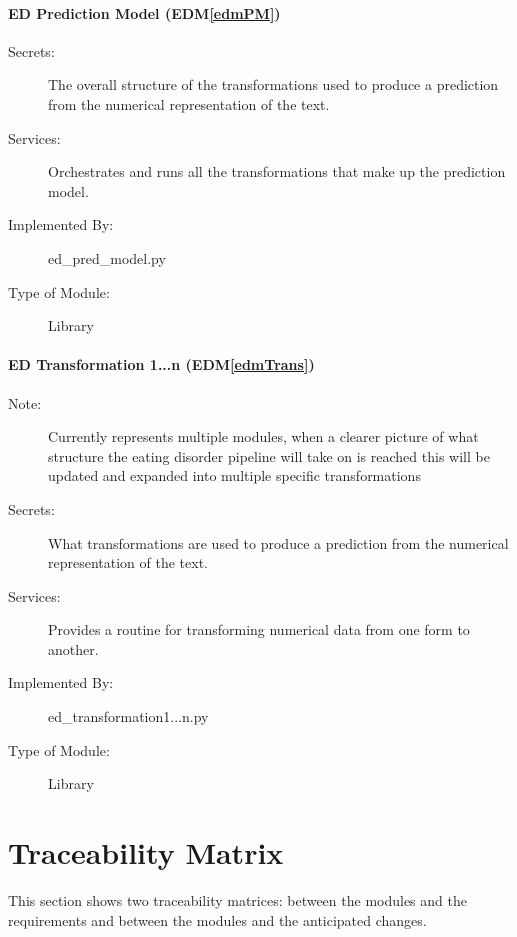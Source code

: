\documentclass[12pt, titlepage]{article}
\newcommand{\edmref}[1]{EDM\ref{#1}}
\begin{document}
\paragraph{ED Prediction Model (\edmref{edmPM})}
\begin{description}
\item[Secrets:] The overall structure of the transformations used to produce a prediction from the numerical representation of the text.
\item[Services:] Orchestrates and runs all the transformations that make up the prediction model.
\item[Implemented By:] ed\_pred\_model.py
\item[Type of Module:] Library
\end{description}

\paragraph{ED Transformation 1...n (\edmref{edmTrans})}
\begin{description}
\item[Note:] Currently represents multiple modules, when a clearer picture of what structure the eating disorder pipeline will take on is reached this will be updated and expanded into multiple specific transformations
\item[Secrets:] What transformations are used to produce a prediction from the numerical representation of the text.
\item[Services:] Provides a routine for transforming numerical data from one form to another.
\item[Implemented By:] ed\_transformation1...n.py
\item[Type of Module:] Library
\end{description}

\section{Traceability Matrix} \label{SecTM}

This section shows two traceability matrices: between the modules and the
requirements and between the modules and the anticipated changes.
\end{document}
